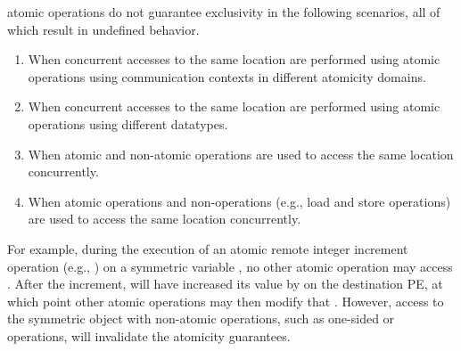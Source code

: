 \openshmem atomic operations do not guarantee exclusivity in the following
scenarios, all of which result in undefined behavior.
\begin{enumerate}
    \item \label{amo-scenario/1}
        When concurrent accesses to the same location are performed using
        \openshmem atomic operations using communication contexts in
        different atomicity domains.
    \item \label{amo-scenario/2}
        When concurrent accesses to the same location are performed using
        \openshmem atomic operations using different datatypes.
    \item \label{amo-scenario/3}
        When atomic and non-atomic \openshmem operations are used to access
        the same location concurrently.
    \item \label{amo-scenario/4}
        When \openshmem atomic operations and non-\openshmem operations (e.g.,
        load and store operations) are used to access the same location
        concurrently.
\end{enumerate}
For example, during the execution of an atomic remote integer increment
operation (e.g., ) on a symmetric variable , no other \openshmem atomic operation
may access .  After the increment,  will have increased its value
by  on the destination \ac{PE}, at which point other atomic operations
may then modify that .  However, access to the symmetric object 
with non-atomic operations, such as one-sided  or  operations,
will invalidate the atomicity guarantees.



